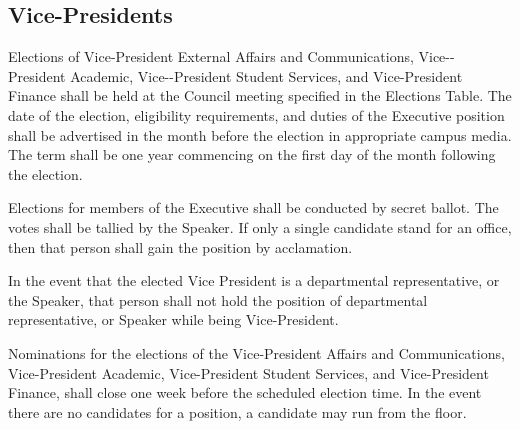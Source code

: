 \subsection{Vice-Presidents}
\begin{longenum}[ label*=\thesubsection.\arabic*., align=left]
	\item Elections of Vice-President External Affairs and Communications, Vice-­-President Academic, Vice-­-President Student Services, and Vice-President Finance shall be held at the Council meeting specified in the Elections Table. The date of the election, eligibility requirements, and duties of the Executive position shall be advertised in the month before the election in appropriate campus media. The term shall be one year commencing on the first day of the month following the election. 
	\item Elections for members of the Executive shall be conducted by secret ballot. The votes shall be tallied by the Speaker. If only a single candidate stand for an office, then that person shall gain the position by acclamation.
	\item In the event that the elected Vice President is a departmental representative, or the Speaker, that person shall not hold the position of departmental representative, or Speaker while being Vice-President. 
	\item Nominations for the elections of the Vice-President Affairs and Communications, Vice-President Academic, Vice-President Student Services, and Vice-President Finance, shall close one week before the scheduled election time. In the event there are no candidates for a position, a candidate may run from the floor.
\end{longenum}


